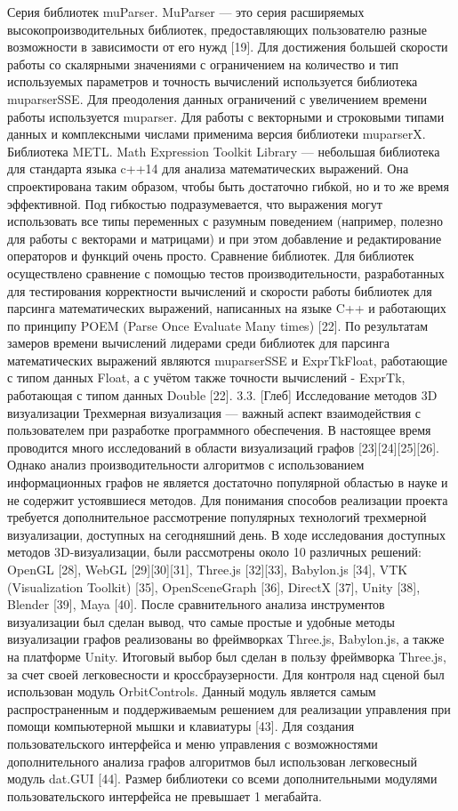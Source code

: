 Серия библиотек muParser.
MuParser — это серия расширяемых высокопроизводительных библиотек, предоставляющих пользователю разные возможности в зависимости от его нужд [19]. Для достижения большей скорости работы со скалярными значениями с ограничением на количество и тип используемых параметров и точность вычислений используется библиотека muparserSSE. Для преодоления данных ограничений с увеличением времени работы используется muparser. Для работы с векторными и строковыми типами данных и комплексными числами применима версия библиотеки muparserX.
Библиотека METL.
Math Expression Toolkit Library — небольшая библиотека для стандарта языка c++14 для анализа математических выражений. Она спроектирована таким образом, чтобы быть достаточно гибкой, но и то же время эффективной. Под гибкостью подразумевается, что выражения могут использовать все типы переменных с разумным поведением (например, полезно для работы с векторами и матрицами) и при этом добавление и редактирование операторов и функций очень просто.
Сравнение библиотек.
Для библиотек осуществлено сравнение с помощью тестов производительности, разработанных для тестирования корректности вычислений и скорости работы библиотек для парсинга математических выражений, написанных на языке C++ и работающих по принципу POEM (Parse Once Evaluate Many times) [22]. По результатам замеров времени вычислений лидерами среди библиотек для парсинга математических выражений являются muparserSSE и ExprTkFloat, работающие с типом данных Float, а с учётом также точности вычислений - ExprTk, работающая с типом данных  Double [22].
3.3. [Глеб] Исследование методов 3D визуализации
Трехмерная визуализация — важный аспект взаимодействия с пользователем при разработке программного обеспечения. В настоящее время проводится много исследований в области визуализаций графов [23][24][25][26]. Однако анализ производительности алгоритмов с использованием информационных графов не является достаточно популярной областью в науке и не содержит устоявшиеся методов. Для понимания способов реализации проекта требуется дополнительное рассмотрение популярных технологий трехмерной визуализации, доступных на сегодняшний день. В ходе исследования доступных методов 3D-визуализации, были рассмотрены около 10 различных решений: OpenGL [28], WebGL [29][30][31], Three.js [32][33], Babylon.js [34], VTK (Visualization Toolkit) [35], OpenSceneGraph [36], DirectX [37], Unity [38], Blender [39], Maya [40].
После сравнительного анализа инструментов визуализации был сделан вывод, что самые простые и удобные методы визуализации графов реализованы во фреймворках Three.js, Babylon.js, а также на платформе Unity. Итоговый выбор был сделан в пользу фреймворка Three.js, за счет своей легковесности и кроссбраузерности. Для контроля над сценой был использован модуль OrbitControls. Данный модуль является самым распространенным и поддерживаемым решением для реализации управления при помощи компьютерной мышки и клавиатуры [43]. Для создания пользовательского интерфейса и меню управления с возможностями дополнительного анализа графов алгоритмов был использован легковесный модуль dat.GUI [44]. Размер библиотеки со всеми дополнительными модулями пользовательского интерфейса не превышает 1 мегабайта.
